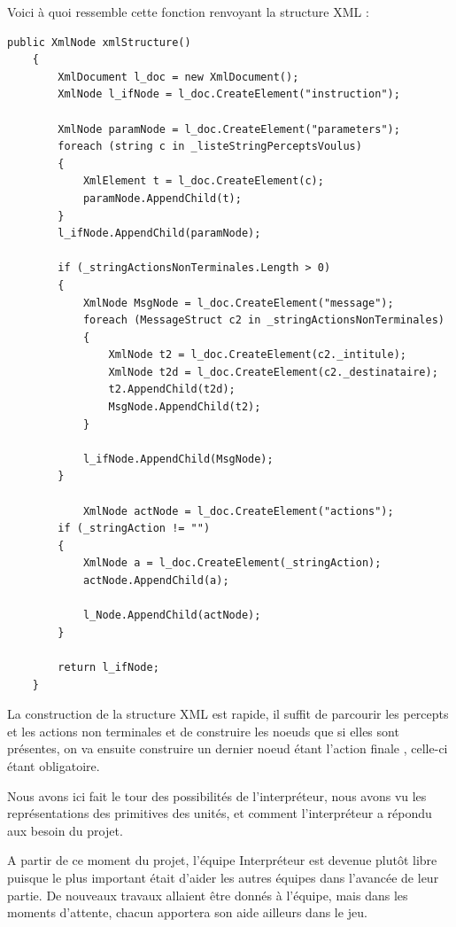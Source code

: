 \documentclass{report}
\begin{document}
Voici à quoi ressemble cette fonction renvoyant la structure XML :
\begin{lstlisting}[frame=single]
 public XmlNode xmlStructure()
    {
        XmlDocument l_doc = new XmlDocument();
        XmlNode l_ifNode = l_doc.CreateElement("instruction");

        XmlNode paramNode = l_doc.CreateElement("parameters");
        foreach (string c in _listeStringPerceptsVoulus)
        {
            XmlElement t = l_doc.CreateElement(c);
            paramNode.AppendChild(t);
        }
        l_ifNode.AppendChild(paramNode);

        if (_stringActionsNonTerminales.Length > 0)
        {
            XmlNode MsgNode = l_doc.CreateElement("message");
            foreach (MessageStruct c2 in _stringActionsNonTerminales)
            {
                XmlNode t2 = l_doc.CreateElement(c2._intitule);
                XmlNode t2d = l_doc.CreateElement(c2._destinataire);
                t2.AppendChild(t2d);
                MsgNode.AppendChild(t2);
            }

            l_ifNode.AppendChild(MsgNode);
        }

            XmlNode actNode = l_doc.CreateElement("actions");
        if (_stringAction != "")
        {
            XmlNode a = l_doc.CreateElement(_stringAction);
            actNode.AppendChild(a);

            l_Node.AppendChild(actNode);
        }

        return l_ifNode;
    }
\end{lstlisting}

La construction de la structure XML est rapide, il suffit de parcourir les percepts et les actions non terminales et de construire les noeuds que si elles sont présentes, on va ensuite construire un dernier noeud étant l’action finale , celle-ci étant obligatoire.

Nous avons ici fait le tour des possibilités de l’interpréteur, nous avons vu les représentations des primitives des unités, et comment l’interpréteur a répondu aux besoin du projet. 

A partir de ce moment du projet, l’équipe Interpréteur est devenue plutôt libre puisque le plus important était d’aider les autres équipes dans l’avancée de leur partie. De nouveaux travaux allaient être donnés à l’équipe, mais dans les moments d’attente, chacun apportera son aide ailleurs dans le jeu.

\newpage
\paragraph{}
\end{document}
